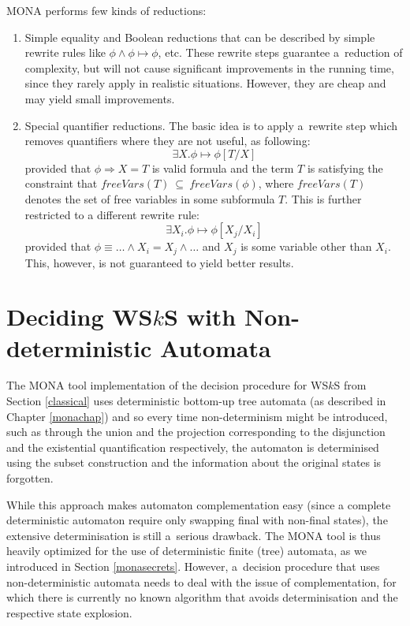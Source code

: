MONA performs few kinds of reductions:
\begin{enumerate}
 \item Simple equality and Boolean reductions that can be described by simple
 rewrite rules like $\phi \wedge \phi \mapsto \phi$, etc. These rewrite
 steps guarantee a~reduction of complexity, but will not cause significant
 improvements in the running time, since they rarely apply in realistic
 situations. However, they are cheap and may yield small improvements.

\item Special quantifier reductions. The basic idea is to apply a~rewrite step
which removes quantifiers where they are not useful, as following:
\begin{equation}\exists X . \phi \mapsto \phi[T/X]
\end{equation}
provided that $\phi \Rightarrow X = T$ is valid formula and the term $T$ is
satisfying the constraint that $\mathit{freeVars}(T)~\subseteq~\mathit{freeVars}(\phi)$, where
$\mathit{freeVars}(T)$ denotes the set of free variables in some subformula $T$.
This is further restricted to a different rewrite rule: \begin{equation} \exists
X_i .\phi \mapsto \phi[X_j/X_i]
\end{equation} provided that $\phi \equiv
\ldots \wedge X_i = X_j \wedge \ldots$ and $X_j$ is some variable other than
$X_i$. This, however, is not guaranteed to yield better results.
\end{enumerate}

 \chapter{Deciding WS$k$S with Non-deterministic Automata}\label{our}

The \textsc{MONA} tool implementation of the decision procedure for WS$k$S from
Section \ref{classical} uses deterministic bottom-up tree automata (as described
in Chapter \ref{monachap}) and so every time non-determinism might be
introduced, such as through the union and the projection corresponding to
the disjunction and the existential quantification respectively, the automaton
is determinised using the subset construction and the information about the original states is forgotten.

While this approach makes automaton complementation easy (since
a complete deterministic automaton require only swapping final with non-final
states), the extensive determinisation is still a~serious drawback. The \textsc{MONA} tool is
thus heavily optimized for the use of deterministic finite (tree)
automata, as we introduced in Section \ref{monasecrets}. However, a~decision
procedure that uses non-deterministic automata needs to deal with the issue of
complementation, for which there is currently no known algorithm that avoids
determinisation and the respective state explosion.

